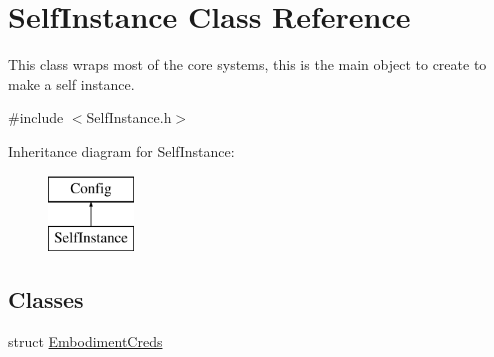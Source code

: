 \hypertarget{class_self_instance}{}\section{Self\+Instance Class Reference}
\label{class_self_instance}


This class wraps most of the core systems, this is the main object to create to make a self instance.  




{\ttfamily \#include $<$Self\+Instance.\+h$>$}

Inheritance diagram for Self\+Instance\+:\begin{figure}[H]
\begin{center}
\leavevmode
\includegraphics[height=2.000000cm]{class_self_instance}
\end{center}
\end{figure}
\subsection*{Classes}
\begin{DoxyCompactItemize}
\item 
struct \hyperlink{struct_self_instance_1_1_embodiment_creds}{Embodiment\+Creds}
\end{DoxyCompactItemize}
